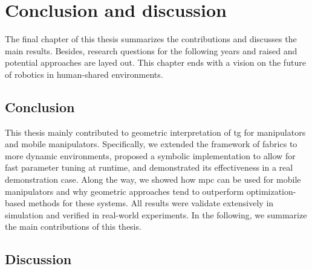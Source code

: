 \chapter{Conclusion and discussion}
\label{cha:conclusion_and_discussion}

The final chapter of this thesis summarizes the contributions and discusses the
main results. Besides, research questions for the following years and raised and
potential approaches are layed out. This chapter ends with a vision on the
future of robotics in human-shared environments.

\section{Conclusion}
\label{sec:conclusion}

This thesis mainly contributed to geometric interpretation of \ac{tg} for manipulators
and mobile manipulators. Specifically, we extended the framework of \ac{fabrics}
to more dynamic environments, proposed a symbolic implementation to allow for
fast parameter tuning at runtime, and demonstrated its effectiveness in
a real demonstration case. Along the way, we showed how \ac{mpc} can be used for
mobile manipulators and why geometric approaches tend to outperform
optimization-based methods for these systems. All results were validate
extensively in simulation and verified in real-world experiments.
In the following, we summarize the main contributions of this thesis.

\section{Discussion}
\label{sec:discussion}




